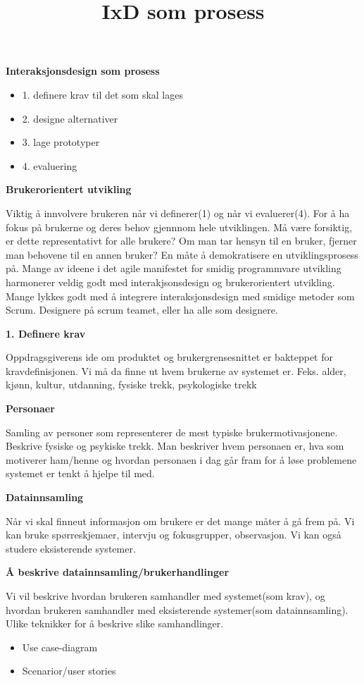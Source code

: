 \documentclass{article}
\title{IxD som prosess}
\begin{document}
\begin{flushleft}
\textbf{Interaksjonsdesign som prosess}
\begin{itemize}
    \item 1. definere krav til det som skal lages
    \item 2. designe alternativer
    \item 3. lage prototyper
    \item 4. evaluering
\end{itemize}


\textbf{Brukerorientert utvikling}\par
Viktig å innvolvere brukeren når vi definerer(1) og når vi evaluerer(4). 
For å ha fokus på brukerne og deres behov gjennnom hele utviklingen.
Må være forsiktig, er dette representativt for alle brukere? 
Om man tar hensyn til en bruker, fjerner man behovene til en annen bruker? 
En måte å demokratisere en utviklingsprosess på. 
Mange av ideene i det agile manifestet for smidig programmvare utvikling harmonerer veldig godt med interakjsonsdesign og brukerorientert utvikling.
Mange lykkes godt med å integrere interaksjonsdesign med smidige metoder som Scrum. 
Designere på scrum teamet, eller ha alle som designere.

\bigskip

\textbf{1. Definere krav}\par
Oppdragsgiverens ide om produktet og brukergrensesnittet er bakteppet for kravdefinisjonen. 
Vi må da finne ut hvem brukerne av systemet er. Feks. alder, kjønn, kultur, utdanning, fysiske trekk, psykologiske trekk

\bigskip

\textbf{Personaer}\par 
Samling av personer som representerer de mest typiske brukermotivasjonene. Beskrive fysiske og psykiske trekk.
Man beskriver hvem personaen er, hva som
motiverer ham/henne og hvordan personaen i dag går fram for å løse problemene systemet er
tenkt å hjelpe til med.
\bigskip

\textbf{Datainnsamling}\par
Når vi skal finneut informasjon om brukere er det mange måter å gå frem på. Vi kan bruke spørreskjemaer, intervju og fokusgrupper, observasjon.
Vi kan også studere eksisterende systemer.
\bigskip

\textbf{Å beskrive datainnsamling/brukerhandlinger}\par
Vi vil beskrive hvordan brukeren samhandler med systemet(som krav), og hvordan brukeren samhandler med eksisterende systemer(som datainnsamling).
Ulike teknikker for å beskrive slike samhandlinger.
\begin{itemize}
    \item Use case-diagram
    \item Scenarior/user stories
\end{itemize}


\end{flushleft}
\end{document}
